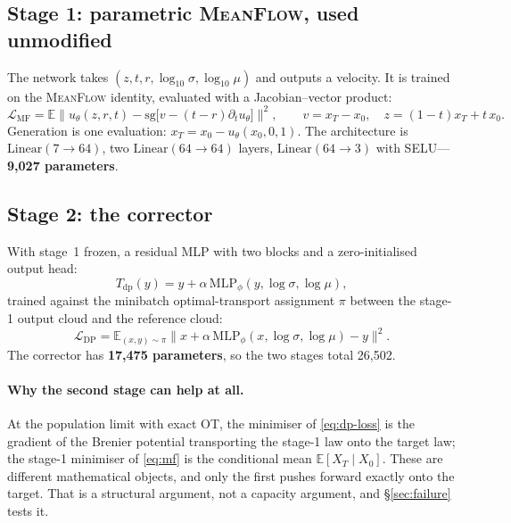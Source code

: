 ﻿\documentclass[11pt,a4paper]{article}
\newcommand{\MF}{\textsc{MeanFlow}}
\begin{document}
\subsection{Stage 1: parametric \MF{}, used unmodified}

The network takes $(z,t,r,\log_{10}\sigma,\log_{10}\mu)$ and outputs a velocity. It is trained on
the \MF{} identity, evaluated with a Jacobian--vector product:
\begin{equation}
\mathcal{L}_{\text{MF}}
=\mathbb{E}\Big\|u_\theta(z,r,t)-\mathrm{sg}\big[v-(t-r)\partial_t u_\theta\big]\Big\|^2,
\qquad
v=x_T-x_0,\quad z=(1-t)x_T+t\,x_0 .
\label{eq:mf}
\end{equation}
Generation is one evaluation: $x_T=x_0-u_\theta(x_0,0,1)$. The architecture is
$\mathrm{Linear}(7\to64)$, two $\mathrm{Linear}(64\to64)$ layers, $\mathrm{Linear}(64\to3)$ with
SELU---\textbf{9{,}027 parameters}.

\subsection{Stage 2: the corrector}

With stage~1 frozen, a residual MLP with two blocks and a zero-initialised output head:
\begin{equation}
T_{\text{dp}}(y)=y+\alpha\,\mathrm{MLP}_\phi(y,\log\sigma,\log\mu),
\label{eq:dp-map}
\end{equation}
trained against the minibatch optimal-transport assignment $\pi$ between the stage-1 output cloud
and the reference cloud:
\begin{equation}
\mathcal{L}_{\text{DP}}
=\mathbb{E}_{(x,y)\sim\pi}\Big\|x+\alpha\,\mathrm{MLP}_\phi(x,\log\sigma,\log\mu)-y\Big\|^2 .
\label{eq:dp-loss}
\end{equation}
The corrector has \textbf{17{,}475 parameters}, so the two stages total 26{,}502.

\paragraph{Why the second stage can help at all.} At the population limit with exact OT, the
minimiser of \eqref{eq:dp-loss} is the gradient of the Brenier potential transporting the stage-1
law onto the target law; the stage-1 minimiser of \eqref{eq:mf} is the conditional mean
$\mathbb{E}[X_T\mid X_0]$. These are different mathematical objects, and only the first pushes
forward exactly onto the target. That is a structural argument, not a capacity argument, and
\S\ref{sec:failure} tests it.
\end{document}
